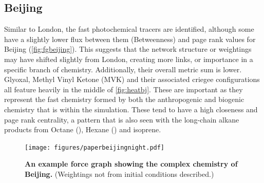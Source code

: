 \subsection*{Beijing}


Similar to London, the fast photochemical tracers are identified, although some have a slightly lower flux between them (Betweenness) and page rank values for Beijing (\autoref{fig:fgbeijing}). This suggests that the network structure or weightings may have shifted slightly from London, creating more links, or importance in a specific branch of chemistry. 
 Additionally, their overall metric sum is lower. Glyoxal, Methyl Vinyl Ketone (MVK) and their associated criegee configurations all feature heavily in the middle of \autoref{fig:heatbj}. These are important as they represent the fast chemistry formed by both the anthropogenic and biogenic chemistry that is within the simulation. These tend to have a high closeness and page rank centrality, a pattern that is also seen with the long-chain alkane products from Octane (), Hexane () and isoprene.

 \begin{figure}[H]
      \centering
          \texttt{[image: figures/paperbeijingnight.pdf]}
         \caption{ \textbf{An example force graph showing the complex chemistry of Beijing.} (Weightings not from initial conditions described.)}
         \label{fig:fgbeijing}
 \end{figure}




% 

